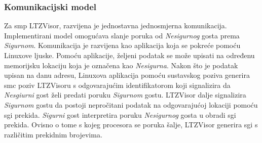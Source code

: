 \documentclass[times, utf8, diplomski, numeric]{fer}
\begin{document}
\subsubsection{Komunikacijski model}
Za \gls{smp} LTZVisor, razvijena je jednostavna jednosmjerna komunikacija. Implementirani model omogućava slanje poruka od
\textit{Nesigurnog} gosta prema \textit{Sigurnom}. Komunikacija je razvijena kao aplikacija koja se pokreće pomoću Linuxove
ljuske. Pomoću aplikacije, željeni podatak se može upisati na određenu memorijsku lokaciju koja je označena kao
\textit{Nesigurna}. Nakon što je podatak upisan na danu adresu, Linuxova aplikacija pomoću sustavskog poziva generira
\gls{smc} poziv LTZVisoru s odgovarajućim identifikatorom koji signalizira da \textit{Nesgiurni} gost želi predati poruku
\textit{Sigurnom} gostu. LTZVisor dalje signalizira \textit{Sigurnom} gostu da postoji nepročitani podatak na odgovarajućoj
lokaciji pomoću \gls{sgi} prekida. \textit{Sigurni} gost interpretira poruku \textit{Nesigurnog} gosta u obradi \gls{sgi} prekida.
Ovisno o tome s kojeg procesora se poruka šalje, LTZVisor generira \gls{sgi} s različitim prekidnim brojevima.
\end{document}
